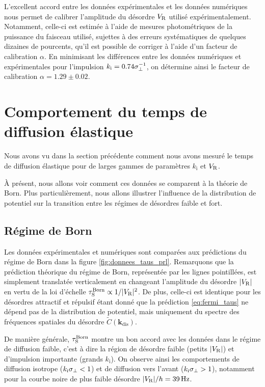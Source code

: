 L'excellent accord entre les données expérimentales et les données numériques nous permet de calibrer l'amplitude du désordre $V_{\mathrm{R}}$ utilisé expérimentalement. Notamment, celle-ci est estimée à l'aide de mesures photométriques de la puissance du faisceau utilisé, sujettes à des erreurs systématiques de quelques dizaines de pourcents, qu'il est possible de corriger à l'aide d'un facteur de calibration $\alpha$. En minimisant les différences entre les données numériques et expérimentales pour l'impulsion $k_{\mathrm{i}}=0.74 \sigma_{\perp}^{-1}$, on détermine ainsi le facteur de calibration $\alpha=1.29\pm0.02$.




\section{Comportement du temps de diffusion élastique}
\label{sc:comportement_taus}
Nous avons vu dans la section précédente comment nous avons mesuré le temps de diffusion élastique pour de larges gammes de paramètres $k_{\mathrm{i}}$ et $V_{\mathrm{R}}$. 

À présent, nous allons voir comment ces données se comparent à la théorie de Born. Plus particulièrement, nous allons illustrer l'influence de la distribution de potentiel sur la transition entre les régimes de désordres faible et fort.

\subsection{Régime de Born}
Les données expérimentales et numériques sont comparées aux prédictions du régime de Born dans la figure \ref{fig:donnees_taus_prl}. Remarquons que la prédiction théorique du régime de Born, représentée par les lignes pointillées, est simplement translatée verticalement en changeant l'amplitude du désordre $|V_{\mathrm{R}}|$ en vertu de la loi d'échelle $\tau_{\mathrm{S}}^{\mathrm{Born}} \propto 1/|V_{\mathrm{R}}|^2$. De plus, celle-ci est identique pour les désordres attractif et répulsif étant donné que la prédiction \ref{eq:fermi_taus} ne dépend pas de la distribution de potentiel, mais uniquement du spectre des fréquences spatiales du désordre $\widetilde{C}(\mathbf{k}_{\mathrm{dis}})$. 

De manière générale, $\tau_{\mathrm{S}}^{\mathrm{Born}}$ montre un bon accord avec les données dans le régime de diffusion faible, c'est à dire la région de désordre faible (petits $|V_{\mathrm{R}}|$) et d'impulsion importante (grands $k_{\mathrm{i}}$). On observe ainsi les comportements de diffusion isotrope ($k_{\mathrm{i}}\sigma_{\perp}<1$) et de diffusion vers l'avant ($k_{\mathrm{i}}\sigma_{\perp}>1$), notamment pour la courbe noire de plus faible désordre $|V_{\mathrm{R}}|/h=\SI{39}{\hertz}$. 


